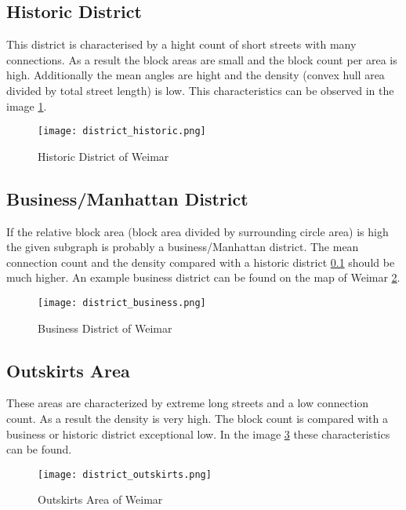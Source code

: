 
\subsection{Historic District}
\label{sec:historyDistinct}
This district is characterised by a hight count of short streets with many connections. As a result the block areas are small and the block count per area is high. Additionally the mean angles are hight and the density (convex hull area divided by total street length) is low. This characteristics can be observed in the image \ref{fig:historic_district}.

\begin{figure}[!ht]
    \centering
    \begin{mdframed}[style=mdthight, userdefinedwidth=0.4\textwidth, align=center]
        \texttt{[image: district\_historic.png]}
    \end{mdframed}
    \caption{Historic District of Weimar}
    \label{fig:historic_district}
\end{figure}

\FloatBarrier
\subsection{Business/Manhattan District} 
\label{sec:businessDistinct}
If the relative block area (block area divided by surrounding circle area) is high the given subgraph is probably a business/Manhattan district. The mean connection count and the density compared with a historic district \ref{sec:historyDistinct} should be much higher. An example business district can be found on the map of Weimar \ref{fig:business_district}.

\begin{figure}[!ht]
    \centering
    \begin{mdframed}[style=mdthight, userdefinedwidth=0.4\textwidth, align=center]
        \texttt{[image: district\_business.png]}
    \end{mdframed}
    \caption{Business District of Weimar}
    \label{fig:business_district}
\end{figure}

\FloatBarrier
\subsection{Outskirts Area}
\label{sec:outskits}
These areas are characterized by extreme long streets and a low connection count. As a result the density is very high. The block count is compared with a business or historic district exceptional low. In the image \ref{fig:outskirts_district} these characteristics can be found.

\begin{figure}[!ht]
    \centering
    \begin{mdframed}[style=mdthight, userdefinedwidth=0.4\textwidth, align=center]
        \texttt{[image: district\_outskirts.png]}
    \end{mdframed}
    \caption{Outskirts Area of Weimar}
    \label{fig:outskirts_district}
\end{figure}